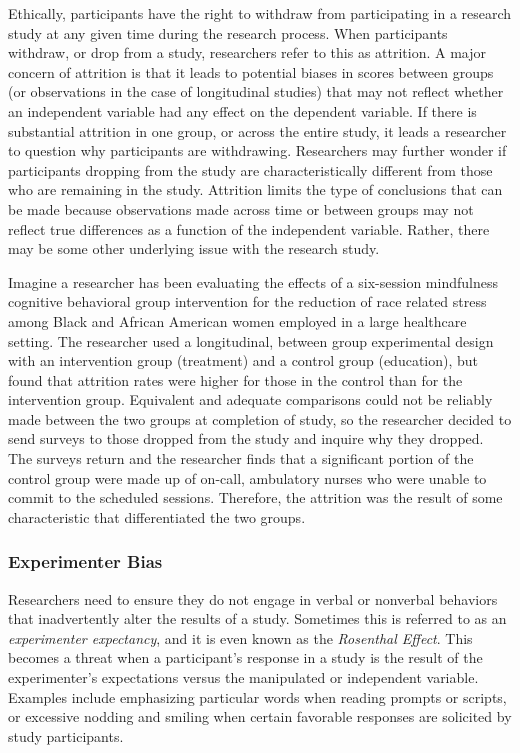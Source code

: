 \documentclass[
  11pt,
]{book}
\begin{document}
Ethically, participants have the right to withdraw from participating in a research study at any given time during the research process. When participants withdraw, or drop from a study, researchers refer to this as attrition. A major concern of attrition is that it leads to potential biases in scores between groups (or observations in the case of longitudinal studies) that may not reflect whether an independent variable had any effect on the dependent variable. If there is substantial attrition in one group, or across the entire study, it leads a researcher to question why participants are withdrawing. Researchers may further wonder if participants dropping from the study are characteristically different from those who are remaining in the study. Attrition limits the type of conclusions that can be made because observations made across time or between groups may not reflect true differences as a function of the independent variable. Rather, there may be some other underlying issue with the research study.

Imagine a researcher has been evaluating the effects of a six-session mindfulness cognitive behavioral group intervention for the reduction of race related stress among Black and African American women employed in a large healthcare setting. The researcher used a longitudinal, between group experimental design with an intervention group (treatment) and a control group (education), but found that attrition rates were higher for those in the control than for the intervention group. Equivalent and adequate comparisons could not be reliably made between the two groups at completion of study, so the researcher decided to send surveys to those dropped from the study and inquire why they dropped. The surveys return and the researcher finds that a significant portion of the control group were made up of on-call, ambulatory nurses who were unable to commit to the scheduled sessions. Therefore, the attrition was the result of some characteristic that differentiated the two groups.

\subsubsection{Experimenter Bias}\label{experimenter-bias}

Researchers need to ensure they do not engage in verbal or nonverbal behaviors that inadvertently alter the results of a study. Sometimes this is referred to as an \emph{experimenter expectancy}, and it is even known as the \emph{Rosenthal Effect}. This becomes a threat when a participant's response in a study is the result of the experimenter's expectations versus the manipulated or independent variable. Examples include emphasizing particular words when reading prompts or scripts, or excessive nodding and smiling when certain favorable responses are solicited by study participants.
\end{document}
